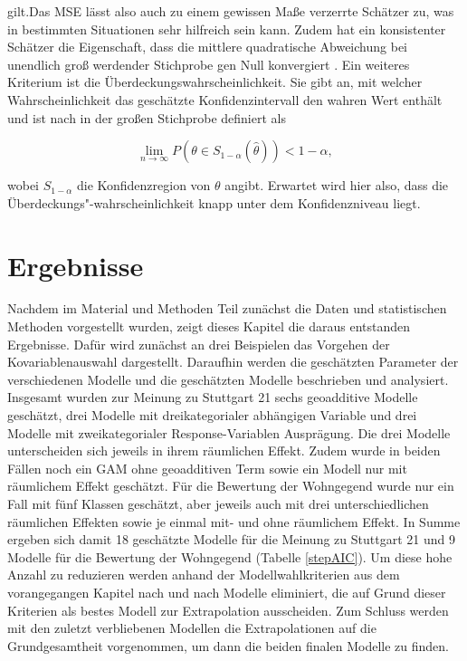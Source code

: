 \documentclass{Vorlage}
\begin{document}
gilt.Das MSE lässt also auch zu einem gewissen Maße verzerrte Schätzer zu, was in bestimmten Situationen sehr hilfreich sein kann. Zudem hat ein konsistenter Schätzer die Eigenschaft, dass die mittlere 
quadratische Abweichung bei unendlich groß werdender Stichprobe gen Null konvergiert \cite[p. 201]{HOG}. Ein weiteres 
Kriterium ist die Überdeckungswahrscheinlichkeit. Sie gibt an, mit welcher Wahrscheinlichkeit das geschätzte 
Konfidenzintervall den wahren Wert enthält und ist nach \cite{zhang} in der großen Stichprobe definiert als

$$
\lim\limits_{n \rightarrow \infty}{P(\theta \in S_{1-\alpha}(\hat{\theta})) < 1-\alpha},
$$

wobei $S_{1-\alpha}$ die Konfidenzregion von $\theta$ angibt. Erwartet wird hier also, dass die Überdeckungs"-wahrscheinlichkeit knapp unter dem
Konfidenzniveau liegt. 

\section{Ergebnisse}
Nachdem im Material und Methoden Teil zunächst die Daten und statistischen Methoden vorgestellt wurden, zeigt dieses Kapitel die daraus entstanden Ergebnisse. Dafür wird zunächst an drei Beispielen das Vorgehen der Kovariablenauswahl dargestellt. Daraufhin werden die geschätzten Parameter der verschiedenen Modelle und die geschätzten Modelle beschrieben und analysiert. Insgesamt wurden zur Meinung zu Stuttgart 21 sechs geoadditive Modelle geschätzt, drei Modelle mit dreikategorialer abhängigen Variable und drei Modelle mit zweikategorialer Response-Variablen Ausprägung. Die drei Modelle unterscheiden sich jeweils in ihrem räumlichen Effekt. Zudem wurde in beiden Fällen noch ein GAM ohne geoadditiven Term sowie ein Modell nur mit räumlichem Effekt geschätzt. Für die Bewertung der Wohngegend wurde nur ein Fall mit fünf Klassen geschätzt, aber jeweils auch mit drei unterschiedlichen räumlichen Effekten sowie je einmal mit- und ohne räumlichem Effekt. In Summe ergeben sich damit 18 geschätzte Modelle für die Meinung zu Stuttgart 21 und 9 Modelle für die Bewertung der Wohngegend (Tabelle \ref{stepAIC}). Um diese hohe Anzahl zu reduzieren werden anhand der Modellwahlkriterien aus dem vorangegangen Kapitel nach und nach Modelle eliminiert, die auf Grund dieser Kriterien als bestes Modell zur Extrapolation ausscheiden. Zum Schluss werden mit den zuletzt verbliebenen Modellen die Extrapolationen auf die Grundgesamtheit vorgenommen, um dann die beiden finalen Modelle zu finden. 
\end{document}
